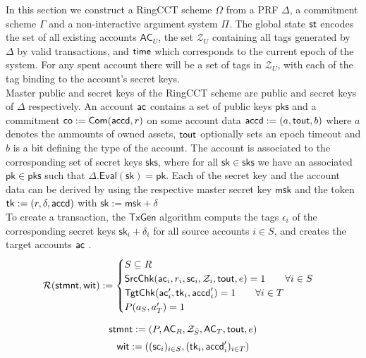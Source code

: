 In this section we construct a RingCCT scheme $\Omega$ from a PRF $\Delta$, a commitment scheme $\Gamma$ and a non-interactive argument system $\Pi$. The global state $\st$ encodes the set of all existing accounts $\mathsf{AC}_U$, the set $\mathcal{Z}_U$ containing all tags generated by $\Delta$ by valid transactions, and $\mathsf{time}$ which corresponds to the current epoch of the system. For any spent account there will be a set of tags in $\mathcal{Z}_U$, with each of the tag binding to the account's secret keys. \\
Master public and secret keys of the RingCCT scheme are public and secret keys of $\Delta$ respectively. An account $\mathsf{ac}$ contains a set of public keys $\mathsf{pks}$ and a commitment $\mathsf{co} := \mathsf{Com}(\mathsf{accd}, r)$ on some account data $\mathsf{accd} := (a, \mathsf{tout}, b)$ where $a$ denotes the ammounts of owned assets, $\mathsf{tout}$ optionally sets an epoch timeout and $b$ is a bit defining the type of the account. The account is associated to the corresponding set of secret keys $\mathsf{sks}$, where for all $\mathsf{sk} \in \mathsf{sks}$ we have an associated $\mathsf{pk} \in \mathsf{pks}$ such that $\Delta.\mathsf{Eval}(\mathsf{sk}) = \mathsf{pk}$. Each of the secret key and the account data can be derived by using the respective master secret key $\mathsf{msk}$ and the token $\mathsf{tk} := (r, \delta, \mathsf{accd})$ with $\mathsf{sk} := \mathsf{msk} + \delta$ \\ 
To create a transaction, the $\mathsf{TxGen}$ algorithm computs the tags $\epsilon_i$ of the corresponding secret keys $\mathsf{sk}_i + \delta_i$ for all source accounts $i \in S$, and creates the target accounts $\mathsf{ac}$ .
\begin{equation*}
\mathcal{R}(\mathsf{stmnt}, \mathsf{wit}) := \begin{cases} 
    S \subseteq R \\ 
    \mathsf{SrcChk}(\mathsf{ac}_i, r_i, \mathsf{sc}_i, \mathcal{Z}_i, \mathsf{tout}, e) = 1 \qquad \forall i \in S \\ 
    \mathsf{TgtChk}(\mathsf{ac}'_i, \mathsf{tk}_i, \mathsf{accd}'_i) = 1 \qquad \forall i \in T \\ 
    P(a_S, a'_T) = 1
\end{cases}
\end{equation*}

\begin{equation*}
\mathsf{stmnt} := (P,\mathsf{AC}_R,\mathcal{Z}_{\bar{S}}, \mathsf{AC}_T, \mathsf{tout}, e) \\
\end{equation*}
\begin{equation*}
	\mathsf{wit} := ((\mathsf{sc}_i)_{i\in S}, (\mathsf{tk}_i, \mathsf{accd}'_i)_{i\in T}) \\
\end{equation*}

